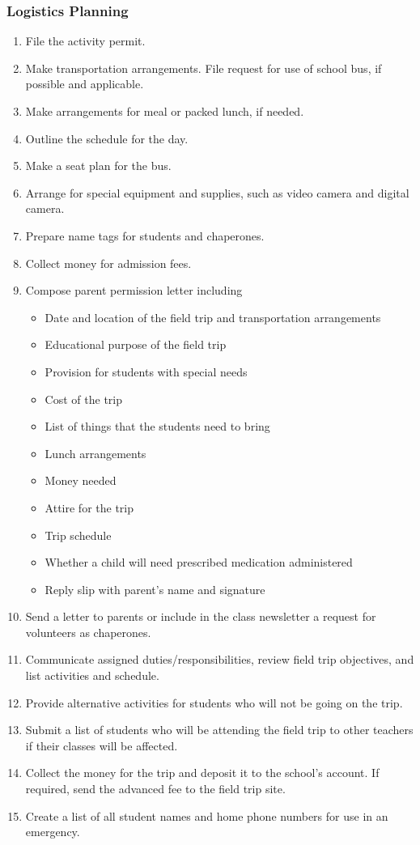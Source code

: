 \subsubsection*{Logistics Planning}
\begin{enumerate}
\item File the activity permit.
\item Make transportation arrangements. File request for use of school bus, if possible and applicable.
\item Make arrangements for meal or packed lunch, if needed.
\item Outline the schedule for the day.
\item Make a seat plan for the bus.
\item Arrange for special equipment and supplies, such as video camera and digital camera.
\item Prepare name tags for students and chaperones.
\item Collect money for admission fees.
\item Compose parent permission letter including
	\begin{itemize}
	\item Date and location of the field trip and transportation arrangements
	\item Educational purpose of the field trip
	\item Provision for students with special needs
	\item Cost of the trip
	\item List of things that the students need to bring
	\item Lunch arrangements
	\item Money needed
	\item Attire for the trip
	\item Trip schedule
	\item Whether a child will need prescribed medication administered
	\item Reply slip with parent's name and signature
	\end{itemize}
\item Send a letter to parents or include in the class newsletter a request for volunteers as
chaperones.
\item Communicate assigned duties/responsibilities, review field trip objectives, and list activities and
schedule.
\item Provide alternative activities for students who will not be going on the trip.
\item Submit a list of students who will be attending the field trip to other teachers if their classes will
be affected.
\item Collect the money for the trip and deposit it to the school's account. If required, send the
advanced fee to the field trip site.
\item Create a list of all student names and home phone numbers for use in an emergency.
\end{enumerate}
